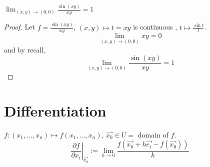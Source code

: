 \documentclass[12pt]{book}
\theoremstyle{definition}
\theoremstyle{remark}
\begin{document}
  \begin{example}
    $\lim_{(x,y) \rightarrow (0,0)} \frac{\sin(xy)}{xy} = 1$
    \begin{proof} 
      Let $f=\frac{\sin(xy)}{xy}$, $(x,y) \mapsto t = xy$ is continuous , $t \mapsto \frac{\sin t }{t} $. $$\lim_{(x,y) \rightarrow (0,0)}xy = 0 $$
      and by recall, $$\lim_{(x,y) \rightarrow (0,0)} \frac{\sin (xy)}{xy} = 1 $$
    \end{proof}
    
  \end{example}
  \section{Differentiation}
  $f: (x_1, ..., x_n) \mapsto f(x_1,...,x_n)$, $\vec{{x_0}} \in U =$ domain of $f$. $$\left. \frac{\partial f}{\partial x_i}\right|_{\vec{{x_0}} } := \lim_{h \rightarrow 0} \frac{f(\vec{{x_0}} + h \vec{{e_i}} -f(\vec{{x_0}} ))}{h}   $$
\end{document}
